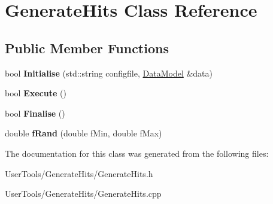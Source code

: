 \hypertarget{classGenerateHits}{
\section{GenerateHits Class Reference}
\label{classGenerateHits}
}
\subsection*{Public Member Functions}
\begin{DoxyCompactItemize}
\item 
\hypertarget{classGenerateHits_a11c98b7819edf56f56d1981b72ed9e24}{
bool {\bfseries Initialise} (std::string configfile, \hyperlink{classDataModel}{DataModel} \&data)}
\label{classGenerateHits_a11c98b7819edf56f56d1981b72ed9e24}

\item 
\hypertarget{classGenerateHits_a3bf8e799c8fd096b2b3e802693fc043d}{
bool {\bfseries Execute} ()}
\label{classGenerateHits_a3bf8e799c8fd096b2b3e802693fc043d}

\item 
\hypertarget{classGenerateHits_a2c84756b951a63d38a6601a61334895d}{
bool {\bfseries Finalise} ()}
\label{classGenerateHits_a2c84756b951a63d38a6601a61334895d}

\item 
\hypertarget{classGenerateHits_ae875934539804dd522f826c7d14e4bca}{
double {\bfseries fRand} (double fMin, double fMax)}
\label{classGenerateHits_ae875934539804dd522f826c7d14e4bca}

\end{DoxyCompactItemize}


The documentation for this class was generated from the following files:\begin{DoxyCompactItemize}
\item 
UserTools/GenerateHits/GenerateHits.h\item 
UserTools/GenerateHits/GenerateHits.cpp\end{DoxyCompactItemize}
